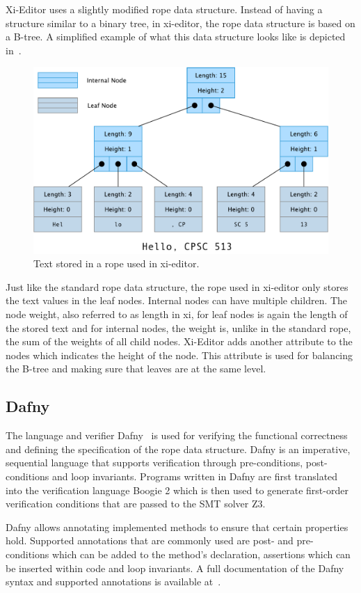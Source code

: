 Xi-Editor uses a slightly modified rope data structure.
Instead of having a structure similar to a binary tree, in xi-editor, the rope data structure is based on a B-tree.
A simplified example of what this data structure looks like is depicted in~.

\begin{figure}[h]
\centering
\includegraphics[width=\linewidth]{"figures/xi-rope"}
\caption{Text stored in a rope used in xi-editor.}
\label{fig:xi-rope}
\end{figure}

Just like the standard rope data structure, the rope used in xi-editor only stores the text values in the leaf nodes.
Internal nodes can have multiple children.
The node weight, also referred to as length in xi, for leaf nodes is again the length of the stored text and for internal nodes, the weight is, unlike in the standard rope, the sum of the weights of all child nodes.
Xi-Editor adds another attribute to the nodes which indicates the height of the node.
This attribute is used for balancing the B-tree and making sure that leaves are at the same level.

\subsection{Dafny}

The language and verifier Dafny~\cite{leino2010dafny} is used for verifying the functional correctness and defining the specification of the rope data structure.
Dafny is an imperative, sequential language that supports verification through pre-conditions, post-conditions and loop invariants.
Programs written in Dafny are first translated into the verification language Boogie 2 which is then used to generate first-order verification conditions that are passed to the SMT solver Z3.

Dafny allows annotating implemented methods to ensure that certain properties hold.
Supported annotations that are commonly used are post- and pre-conditions which can be added to the method's declaration, assertions which can be inserted within code and loop invariants.
A full documentation of the Dafny syntax and supported annotations is available at~\cite{dafnyManual}.
